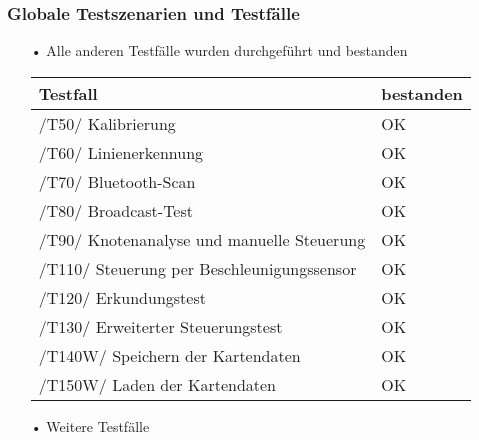 \documentclass[xcolor=dvipsnames]{beamer}
\begin{document}
		\begin{frame}
	\frametitle{Globale Testszenarien und Testfälle}
		\begin{itemize}
			\item[•]Alle anderen Testfälle wurden durchgeführt und bestanden
		
		            \begin{tabular}{l|p{2cm}}
				\hline
					\textbf{Testfall} & \textbf{bestanden}\\
				\hline \hline
					 /T50/ Kalibrierung & OK \\
 				\hline
					/T60/ Linienerkennung & OK \\
				\hline		
					/T70/ Bluetooth-Scan & OK \\
				\hline	
					/T80/ Broadcast-Test & OK \\
				\hline		
					/T90/ Knotenanalyse und manuelle Steuerung & OK \\
				\hline	
					/T110/ Steuerung per Beschleunigungssensor & OK \\
				\hline									
					/T120/ Erkundungstest & OK \\
				\hline			
					/T130/ Erweiterter Steuerungstest & OK \\
				\hline		
					/T140W/ Speichern der Kartendaten & OK \\
				\hline		
					/T150W/ Laden der Kartendaten & OK \\
				\hline		
			\end{tabular}
			\item[•]Weitere Testfälle		
		\end{itemize}
	\end{frame}
\end{document}
